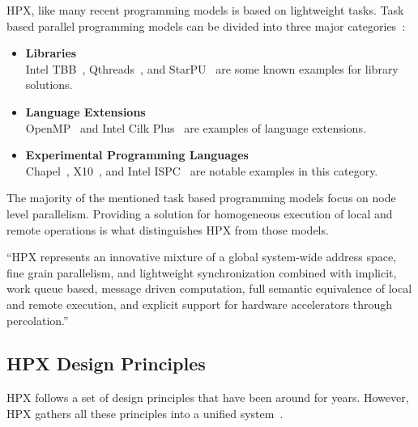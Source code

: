 HPX, like many recent programming models is based on lightweight tasks. Task based parallel programming models can be divided into three major categories~\cite{kaiser2014hpx,podobas2010comparison}:

\begin{itemize}
  \item \textbf{Libraries}\\
    Intel TBB~\cite{pheatt2008intel}, Qthreads~\cite{wheeler2008qthreads}, and StarPU~\cite{augonnet2011starpu} are some known examples for library solutions.
  \item \textbf{Language Extensions}\\
    OpenMP~\cite{dagum1998openmp} and Intel Cilk Plus~\cite{robison2012cilk} are examples of language extensions.
  \item \textbf{Experimental Programming Languages}\\
    Chapel~\cite{chamberlain2007parallel}, X10~\cite{pharr2012ispc}, and Intel ISPC~\cite{pharr2012ispc} are notable examples in this category.
\end{itemize}

The majority of the mentioned task based programming models focus on node level parallelism. Providing a solution for homogeneous execution of local and remote operations is what distinguishes HPX from those models.

``HPX represents an innovative mixture of a global system-wide address space, fine grain parallelism, and lightweight synchronization combined with implicit, work queue based, message driven computation, full semantic equivalence of local and remote execution, and explicit support for hardware accelerators
through percolation.''~\cite{kaiser2014hpx}


\subsection{HPX Design Principles}

HPX follows a set of design principles that have been around for years. However, HPX gathers all these principles into a unified system~\cite{kaiser2014hpx}.

